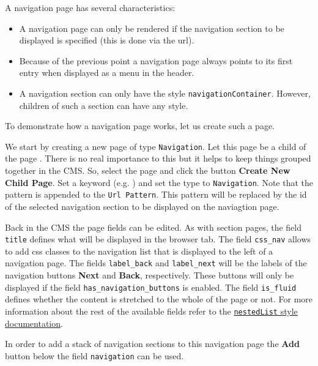 \documentclass[a4paper,oneside]{book}
\begin{document}
A navigation page has several characteristics:
\begin{itemize}
    \item A navigation page can only be rendered if the navigation section to be displayed is specified (this is done via the url).
    \item Because of the previous point a navigation page always points to its first entry when displayed as a menu in the header.
    \item A navigation section can only have the style \texttt{navigationContainer}. However, children of such a section can have any style.
\end{itemize}

To demonstrate how a navigation page works, let us create such a page.

We start by creating a new page of type \texttt{Navigation}.
Let this page be a child of the page .
There is no real importance to this but it helps to keep things grouped together in the CMS.
So, select the page  and click the button \textbf{Create New Child Page}.
Set a keyword (e.g. ) and set the type to \texttt{Navigation}.
Note that the pattern  is appended to the \texttt{Url Pattern}.
This pattern will be replaced by the id of the selected navigation section to be displayed on the naviagtion page.

Back in the CMS the page fields can be edited.
As with section pages, the field \texttt{title} defines what will be displayed in the browser tab.
The field \texttt{css\_nav} allows to add css classes to the navigation list that is displayed to the left of a navigation page.
The fields \texttt{label\_back} and \texttt{label\_next} will be the labels of the navigation buttons \textbf{Next} and \textbf{Back}, respectively.
These buttons will only be displayed if the field \texttt{has\_navigation\_buttons} is enabled.
The field \texttt{is\_fluid} defines whether the content is stretched to the whole of the page or not.
For more information about the rest of the available fields refer to the \href{https://selfhelp.psy.unibe.ch/demo/style/362}{\texttt{nestedList} style documentation}.

In order to add a stack of navigation sections to this navigation page the \textbf{Add} button below the field \texttt{navigation} can be used.
\end{document}
